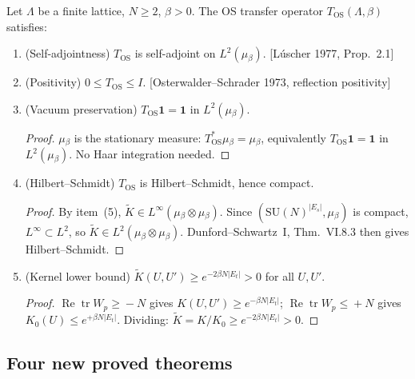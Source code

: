 \begin{lemma}
\label{lem:tm_corr}
Let $\Lambda{}$ be a finite lattice, $N\ge{}2$, $\beta{}>0$.
The OS transfer operator $T_{\mathrm{OS}}(\Lambda{},\beta{})$ satisfies:
\begin{enumerate}
\item{} \textup{(Self-adjointness)} $T_{\mathrm{OS}}$ is self-adjoint on $L^2(\mu{}_\beta{})$. \textup{[L\'uscher 1977, Prop.~2.1]}

\item{} \textup{(Positivity)} $0\le{} T_{\mathrm{OS}}\le{} I$. \textup{[Osterwalder--Schrader 1973, reflection positivity]}

\item{} \textup{(Vacuum preservation)} $T_{\mathrm{OS}}\mathbf{1}=\mathbf{1}$ in $L^2(\mu{}_\beta{})$.
\begin{proof}[Proof]
$\mu{}_\beta{}$ is the stationary measure: $T_{\mathrm{OS}}^*\mu{}_\beta{}=\mu{}_\beta{}$,
equivalently $T_{\mathrm{OS}}\mathbf{1}=\mathbf{1}$ in $L^2(\mu{}_\beta{})$. No Haar integration needed.
\end{proof}

\item{} \textup{(Hilbert--Schmidt)} $T_{\mathrm{OS}}$ is Hilbert--Schmidt, hence compact.
\begin{proof}[Proof]
By item~(5), $\tilde{K}\in{} L^{\infty{}}(\mu{}_\beta{}\otimes{}\mu{}_\beta{})$. Since $(\mathrm{SU}(N)^{|E_s|},\mu{}_\beta{})$ is compact,
$L^{\infty{}}\subset{} L^2$, so $\tilde{K}\in{} L^2(\mu{}_\beta{}\otimes{}\mu{}_\beta{})$. Dunford--Schwartz~I, Thm.~VI.8.3 then gives Hilbert--Schmidt.
\end{proof}

\item{} \textup{(Kernel lower bound)} $\tilde{K}(U,U')\ge{} e^{-2\beta{} N|E_t|}>0$ for all $U,U'$.
\begin{proof}[Proof]
$\operatorname{Re}\operatorname{tr}W_p\ge{}-N$ gives $K(U,U')\ge{}e^{-\beta{} N|E_t|}$;
$\operatorname{Re}\operatorname{tr}W_p\le{}+N$ gives $K_0(U)\le{}e^{+\beta{} N|E_t|}$. Dividing: $\tilde{K}=K/K_0\ge{} e^{-2\beta{} N|E_t|}>0$.
\end{proof}

\end{enumerate}
\end{lemma}

\subsection{Four new proved theorems}
\label{ssec:new_thms212}

